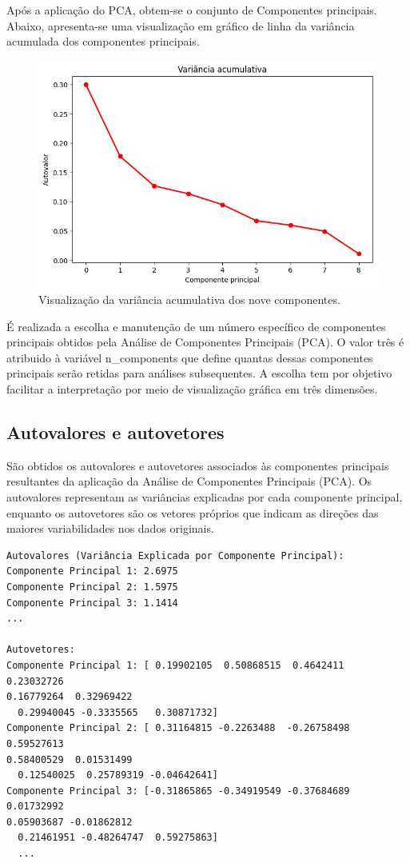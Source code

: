 \documentclass[12pt, a4paper]{article}
\begin{document}
Após a aplicação do PCA, obtem-se o conjunto de Componentes principais. Abaixo, apresenta-se uma visualização em gráfico de linha da variância acumulada dos componentes principais. \\

\begin{figure}[htbp]
    \centering
    \includegraphics[scale=0.5]{img/acum.png}
    \caption{Visualização da variância acumulativa dos nove componentes.}
\end{figure}
É realizada a escolha e manutenção de um número específico de componentes principais obtidos pela Análise de Componentes Principais (PCA). O valor três é atribuido à variável n\_components que define quantas dessas componentes principais serão retidas para análises subsequentes. A escolha tem por objetivo facilitar a interpretação por meio de visualização gráfica em três dimensões. 
\subsection{Autovalores e autovetores}
\par São obtidos os autovalores e autovetores associados às componentes principais resultantes da aplicação da Análise de Componentes Principais (PCA). Os autovalores representam as variâncias explicadas por cada componente principal, enquanto os autovetores são os vetores próprios que indicam as direções das maiores variabilidades nos dados originais. \\
\begin{verbatim}
Autovalores (Variância Explicada por Componente Principal):
Componente Principal 1: 2.6975
Componente Principal 2: 1.5975
Componente Principal 3: 1.1414
...

Autovetores:
Componente Principal 1: [ 0.19902105  0.50868515  0.4642411   0.23032726 
0.16779264  0.32969422
  0.29940045 -0.3335565   0.30871732]
Componente Principal 2: [ 0.31164815 -0.2263488  -0.26758498  0.59527613 
0.58400529  0.01531499
  0.12540025  0.25789319 -0.04642641]
Componente Principal 3: [-0.31865865 -0.34919549 -0.37684689  0.01732992 
0.05903687 -0.01862812
  0.21461951 -0.48264747  0.59275863]
  ...
\end{verbatim}
\end{document}
